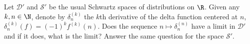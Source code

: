 Let $\mathcal{D}'$ and $\mathcal{S}'$ be the usual Schwartz spaces of
distributions on $\R$. Given any $k,n\in \N$, denote by
$\delta_n^{(k)}$ the $k$th derivative of the delta function centered
at $n$, \ie\ $\delta_n^{(k)}(f)=(-1)^kf^{(k)}(n)$. Does the sequence
$n\mapsto \delta_n^{(n)}$ have a limit in $\mathcal{D}'$ and if it
does, what is the limit? Answer the same question for the space
$\mathcal{S}'$.

